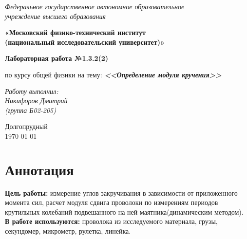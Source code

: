 \documentclass[a4paper,14pt]{extarticle}
\begin{document}
	\begin{center}
		\textit{Федеральное государственное автономное образовательное\\ учреждение высшего образования }
		
		\vspace{0.5ex}
		
		\textbf{«Московский физико-технический институт\\ (национальный исследовательский университет)»}
	\end{center}
	
	\vspace{10ex}
	

	\begin{center}
		\vspace{13ex}	
		\textbf{Лабораторная работа №1.3.2(2)}	
		\vspace{1ex}
	
		по курсу общей физики		
		на тему:		
		\textbf{\textit{<<Определение модуля кручения>>}}		
		\vspace{30ex}

	\begin{flushright}
		\noindent
		\textit{Работу выполнил:}\\  
		\textit{Никифоров Дмитрий \\(группа Б02-205)}
	\end{flushright}
	\vfill
	Долгопрудный \\ \today

\end{center}
\newpage
	\section{Аннотация}
	\textbf{Цель работы:} измерение углов закручивания в зависимости от приложенного момента сил, расчет модуля сдвига проволоки по измерениям периодов крутильных колебаний подвешанного на ней 	маятника(динамическим методом).\\
	\textbf{В работе используются:} проволока из исследуемого материала, грузы, секундомер, микрометр, рулетка, линейка.
\end{document}
